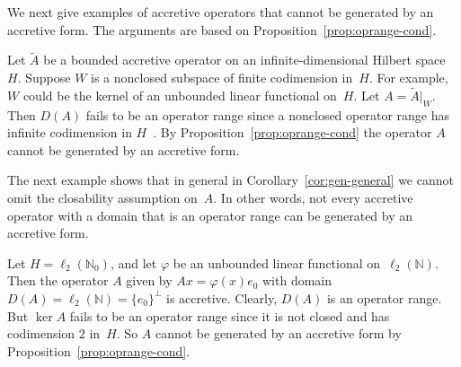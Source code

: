 \documentclass[a4paper,oneside,12pt]{amsart}
\theoremstyle{plain}
\theoremstyle{definition}
\newenvironment{example}
{\pushQED{\qed}

\examplex}
{\popQED\endexamplex}
\begin{document}
We next give examples of accretive operators that cannot be generated by an accretive form.
The arguments are based on Proposition~\ref{prop:oprange-cond}.

\begin{example}
Let $\widetilde{A}$ be a bounded accretive operator on an infinite-dimensional Hilbert space~$H$.
Suppose $W$ is a nonclosed subspace of finite codimension in~$H$. For example, $W$ could be the kernel of an unbounded linear
functional on~$H$.
Let $A={\ensuremath{{\widetilde{A}}|_{{W}}}}$.
Then $D(A)$ fails to be an operator range since 
a nonclosed operator range has infinite codimension in $H$~\cite[Corollary after Theorem~2.3]{FW71:op-rg}.
By Proposition~\ref{prop:oprange-cond} the operator $A$ cannot be generated by an accretive form.
\end{example}

The next example shows that in general in Corollary~\ref{cor:gen-general} we cannot omit the closability assumption on~$A$.
In other words, not every accretive operator with a domain
that is an operator range can be generated by an accretive form.
\begin{example}\label{ex:opran-dom-nongen}
Let $H=\ell_2({\mathbb{N}}_0)$, and let $\varphi$ be an unbounded linear functional on~$\ell_2({\mathbb{N}})$. 
Then the operator $A$ given by $Ax=\varphi(x)e_0$ with domain $D(A)=\ell_2({\mathbb{N}})=\{e_0\}^\perp$ is accretive.
Clearly, $D(A)$ is an operator range.
But $\ker A$ fails to be an operator range since it is not closed and has codimension $2$ in~$H$.
So $A$ cannot be generated by an accretive form by Proposition~\ref{prop:oprange-cond}.
\end{example}
\end{document}
